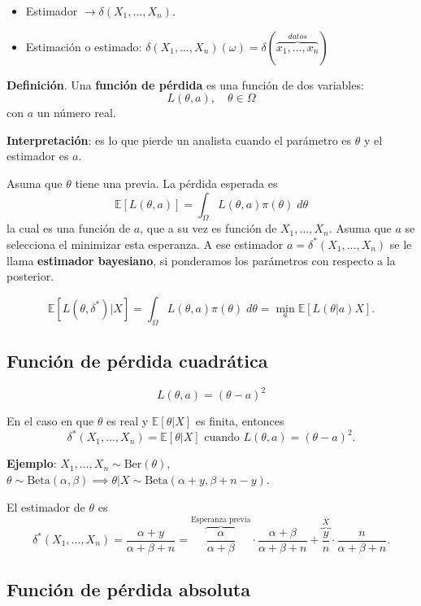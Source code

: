 \documentclass[
  12pt,
]{book}
\providecommand{\tightlist}{%
  \setlength{\itemsep}{0pt}\setlength{\parskip}{0pt}}
\begin{document}
\begin{itemize}
\tightlist
\item
  Estimador \(\to \delta(X_1,\dots,X_n)\).
\item
  Estimación o estimado: \(\delta(X_1,\dots,X_n)(\omega) = \delta(\overbrace{x_1,\dots,x_n}^{datos})\)
\end{itemize}

\textbf{Definición}. Una \textbf{función de pérdida} es una función de dos variables:
\[ L(\theta,a), \quad \theta \in\Omega\]
con \(a\) un número real.

\textbf{Interpretación}: es lo que pierde un analista cuando el parámetro es \(\theta\) y el estimador es \(a\).

Asuma que \(\theta\) tiene una previa. La pérdida esperada es
\[ \mathbb{E}[L(\theta,a)] = \int_{\Omega}L(\theta, a) \pi(\theta)\;d\theta\]
la cual es una función de \(a\), que a su vez es función de \(X_1,\dots,X_n\). Asuma que \(a\) se selecciona el minimizar esta esperanza. A ese estimador \(a = \delta^*(X_1,\dots, X_n)\) se le llama \textbf{estimador bayesiano}, si ponderamos los parámetros con respecto a la posterior.

\[\mathbb{E}[L(\theta, \delta^*)|X] = \int_{\Omega}L(\theta, a) \pi(\theta)\;d\theta = \min_a \mathbb{E}[L(\theta|a)X]. \]

\hypertarget{funciuxf3n-de-puxe9rdida-cuadruxe1tica}{%
\subsection{Función de pérdida cuadrática}\label{funciuxf3n-de-puxe9rdida-cuadruxe1tica}}

\[ L(\theta, a) = (\theta-a)^2\]

En el caso en que \(\theta\) es real y \(\mathbb{E}[\theta|X]\) es finita, entonces
\[ \delta^*(X_1,\dots, X_n) = \mathbb{E}[\theta|X] \text{ cuando } L(\theta,a) = (\theta-a)^2. \]

\textbf{Ejemplo}: \(X_1,\dots, X_n \sim \text{Ber}(\theta)\), \(\theta \sim \text{Beta}(\alpha,\beta) \implies \theta|X \sim \text{Beta}(\alpha+y,\beta+n-y)\).

El estimador de \(\theta\) es
\[ \delta^*(X_1,\dots, X_n) = \dfrac{\alpha+y}{\alpha + \beta + n} = \overbrace{\dfrac{\alpha}{\alpha + \beta} }^{\text{Esperanza previa}}\cdot \dfrac{\alpha +\beta}{\alpha +\beta + n} + \overbrace{\dfrac{y}{n}}^{\bar X}\cdot \dfrac{n}{\alpha +\beta + n}.  \]

\hypertarget{funciuxf3n-de-puxe9rdida-absoluta}{%
\subsection{Función de pérdida absoluta}\label{funciuxf3n-de-puxe9rdida-absoluta}}
\end{document}
